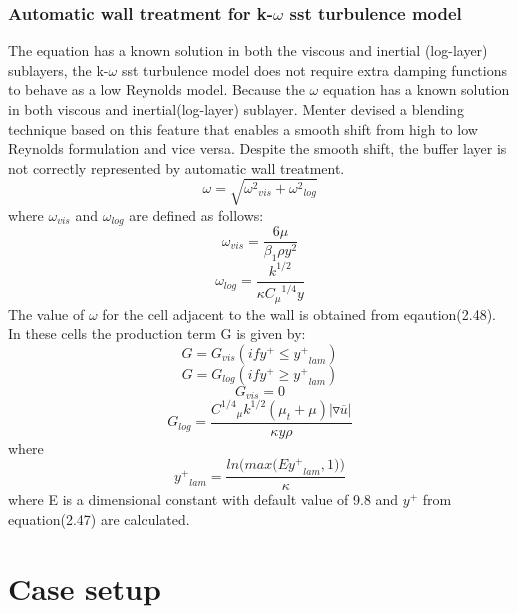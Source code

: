 \subsection{Automatic wall treatment for k-$\omega$ sst turbulence model}
The equation has a known solution in both the viscous and inertial (log-layer) sublayers, the k-$\omega$ sst turbulence model does not require extra damping functions to behave as a low Reynolds model.
Because the $\omega$ equation has a known solution in both viscous and inertial(log-layer) sublayer. Menter devised a blending technique based on this feature that enables a smooth shift from high to low Reynolds formulation and vice versa.
Despite the smooth shift, the buffer layer is not correctly represented by automatic wall treatment. 
\begin{equation}
{\omega}={\sqrt{{{{{\omega}^2}_{vis}}}+{{{{\omega}^2}_{log}}}}}
\end{equation}
where ${\omega}_{vis}$ and ${\omega}_{log}$ are defined as follows:
\begin{equation}
{{\omega}_{vis}}={\frac{6\mu}{{{\beta}_1}{\rho}{y^2}}}
\end{equation}
\begin{equation}
{{\omega}_{log}}={\frac{{k}^{1/2}}{\kappa {{C_{\mu}}^{1/4}} y}}
\end{equation}
The value of $\omega$ for the cell adjacent to the wall is obtained from eqaution(2.48). In these cells the production term G is given by:
\begin{equation}
G={G_{vis}}   (if {y^+}\le{{{y}^+}_{lam}})
\end{equation}
\begin{equation}
G={{G}_{log}} (if {{y^+}}\ge{{{y}^+}_{lam}})
\end{equation}
\begin{equation}
{G_{vis}}=0
\end{equation}
\begin{equation}
{G_{log}}={\frac{{{C}^{1/4}}_{\mu} {{k}^{1/2}}({{\mu}_t}+{\mu})\vert{{\triangledown \overline{u}}}\vert}{\kappa y {\rho}}}
\end{equation}
where
\begin{equation}
{{y^+}_{lam}}={\frac{{ln\bigg(max\bigg(E{{y^+}_{lam}},1\bigg)\bigg)}}{\kappa}}
\end{equation}
where E is a dimensional constant with default value of 9.8 and ${y}^+$ from equation(2.47) are calculated.
\chapter{Case setup}

